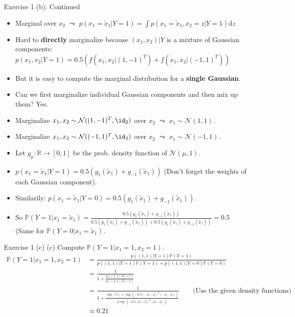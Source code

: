 \documentclass[aspectratio=169]{beamer}
\newcommand{\prob}[1]{\mathbb{P}\left(#1\right)}
\newcommand{\xone}{x_1}
\newcommand{\xtwo}{x_2}
\newcommand{\txone}{\tilde{x}_1}
\begin{document}
\begin{frame}{Exercise 1 (b): Continued}
	\begin{itemize}
		\item<1-> Marginal over $x_2$ $\leadsto$ $p(\xone = \txone | Y=1) = \int p(\xone = \txone, \xtwo = z| Y=1) \mathrm{d}z$
		\item<2-> Hard to \textbf{directly} marginalize because $(\xone, \xtwo) | Y$ is a mixture of Gaussian components: $p(x_1, x_2 | Y=1) = \mathbf{0.5} (f(x_1, x_2 | (1, -1 )^T) + f(x_1, x_2 |(-1, 1)^T))$
		\item<3-> But it is easy to compute the marginal distribution for a \textbf{single Gaussian}.
		\item<4-> Can we first marginalize individual Gaussian components and then mix up them? Yes.
		\item<5-> Marginalize $x_1, x_2\sim \mathcal{N}((1, -1 )^T, \id_2)$ over $x_2$ $\leadsto$ $x_1 \sim \mathcal{N}(1, 1)$. 
		\item<6-> Marginalize $x_1, x_2  \sim \mathcal{N}((-1, 1 )^T, \id_2)$ over $x_2$ $\leadsto$ $x_1 \sim \mathcal{N}(-1, 1)$. 
		\item<7-> Let $g_\mu: \mathbb{R} \rightarrow [0, 1]$ be the prob. density function of $\mathcal{N}(\mu, 1)$.
		\item<8-> $p(\xone = \txone | Y=1) = \mathbf{0.5} (g_{1}(\txone) + g_{-1}(\txone))$ \qquad (Don't forget the weights of each Gaussian component).
		\item<9-> Similarily: $p(\xone = \txone | Y=0) = \mathbf{0.5} (g_{1}(\txone) + g_{-1}(\txone))$.
		\item<10-> So $\prob{Y=1 | \xone = \txone} = \frac{ \mathbf{0.5} (g_{1}(\txone) + g_{-1}(\txone))}{ \mathbf{0.5} (g_{1}(\txone) + g_{-1}(\txone)) +  \mathbf{0.5} (g_{1}(\txone) + g_{-1}(\txone))} = 0.5$ \quad (Same for $\prob{Y=0 | \xone = \txone}$.
	\end{itemize}
\end{frame}

\begin{frame}{Exercise 1 (c)}
	(c) Compute $\prob{Y=1 | \xone = 1, \xtwo = 1}$.
	\small 
	\begin{align*}
		\prob{Y=1 | \xone = 1, \xtwo = 1} &= \frac{p((1, 1) | Y=1) \prob{Y=1}}{p((1, 1) | Y=1) \prob{Y=1} + p((1, 1) | Y=0) \prob{Y=0}} \\
		&= \frac{1}{1 + \frac{p((1, 1) | Y=1)}{p((1, 1) | Y=1)}} \\
		&= \frac{1}{1 + \frac{\exp(0) + \exp(-0.5 (-2, -2)^T (-2, -2))}{2 \exp(-0.5 (0, -2)^T (0, -2))}} \qquad \text{(Use the given density functions)}\\
		&\approx 0.21
	\end{align*}
\end{frame}
\end{document}
